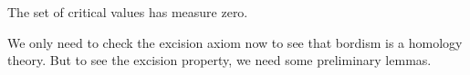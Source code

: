 \documentclass[a4paper,11pt]{article}
\begin{document}
\begin{theorem}\label{sard}
    The set of critical values has measure zero.
\end{theorem}

\begin{comment}[Transversality, Sard, Mayer-Vi\"etoris,...]
Before checking the next axioms, we need to do some more differential topology. (Maybe I will put this in chapter 1\dots)

\begin{definition}[Tangent space\ \cite{lee}]
\end{definition}

Need a few more things, differential, etc.

\begin{definition}[Transversality\ \cite{brocker}]
    Let \(f:M\to N\) a smooth map between manifolds. Let \(U\subseteq N\) be an (\(n-k\))-dimensional submanifold of \(N\) 
\end{definition}
Maybe Lee's definition is better.\\

\begin{definition}[Regular value]
\end{definition}

\begin{theorem}[Sard's theorem\ \cite{lee}]
\end{theorem}

I will not prove this theorem, a proof can be found in\ \cite{lee}.

\begin{definition}[Seperating function\cite{brocker}]
\end{definition}

\begin{lemma}
    Slogan: The Mayer-Vi\"etoris sequence is equivalent to the excision axiom.
\end{lemma}

\begin{lemma}
    The Mayer-Vi\"etoris sequence
    \[\dots\xrightarrow{\partial}\mathfrak{N}_n(X_0\cap X_1)\xrightarrow{\alpha}\mathfrak{N}_n(X_0\oplus\mathfrak{N}_n(X_1))\xrightarrow{\beta}\mathfrak{N}_n(X)\xrightarrow{\partial}\mathfrak{N}_{n-1}(X_0\cap X_1)\xrightarrow{\alpha}\dots\]
    is exact.
\end{lemma}

\end{comment}

We only need to check the excision axiom now to see that bordism is a homology theory. But to see the excision property, we need some preliminary lemmas.
\end{document}
